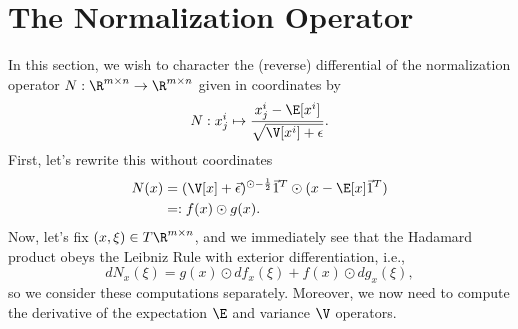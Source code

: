 


\section{The Normalization Operator}\label{sec:normOp}



In this section, we wish to character the (reverse) differential of the normalization operator $N:\R^{m\times n}\to\R^{m\times n}$ given in coordinates by
$$N:x^i_j\mapsto \frac{x^i_j-\E[x^i]}{\sqrt{\V[x^i]+\epsilon}}.$$
First, let's rewrite this without coordinates
\begin{align*}
	N(x)&=(\V[x]+\vec{\epsilon})^{\odot-\frac{1}{2}}\vec{1}^T\odot(x-\E[x]\vec{1}^T)\\
	&=:f(x)\odot g(x).
\end{align*}
Now, let's fix $(x,\xi)\in T\R^{m\times n}$, and we immediately see that the Hadamard product obeys the Leibniz Rule with exterior differentiation, i.e.,
$$dN_x(\xi)=g(x)\odot df_x(\xi)+f(x)\odot dg_x(\xi),$$
so we consider these computations separately.  Moreover, we now need to compute the derivative of the expectation $\E$ and variance $\V$ operators.

